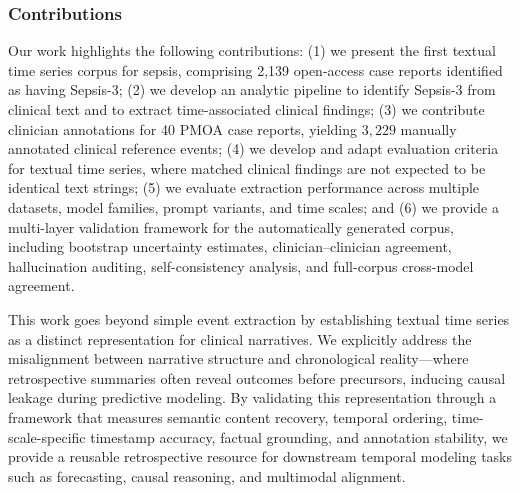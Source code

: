 \subsubsection{Contributions}
Our work highlights the following contributions:
(1) we present the first textual time series corpus for sepsis, comprising 2,139 open-access case reports identified as having Sepsis-3;
(2) we develop an analytic pipeline to identify Sepsis-3 from clinical text and to extract time-associated clinical findings;
(3) we contribute clinician annotations for 40 PMOA case reports, yielding $3,229$ manually annotated clinical reference events;
(4) we develop and adapt evaluation criteria for textual time series, where matched clinical findings are not expected to be identical text strings;
(5) we evaluate extraction performance across multiple datasets, model families, prompt variants, and time scales; and
(6) we provide a multi-layer validation framework for the automatically generated corpus, including bootstrap uncertainty estimates, clinician--clinician agreement, hallucination auditing, self-consistency analysis, and full-corpus cross-model agreement.

This work goes beyond simple event extraction by establishing textual time series as a distinct representation for clinical narratives.
We explicitly address the misalignment between narrative structure and chronological reality---where retrospective summaries often reveal outcomes before precursors, inducing causal leakage during predictive modeling.
By validating this representation through a framework that measures semantic content recovery, temporal ordering, time-scale-specific timestamp accuracy, factual grounding, and annotation stability, we provide a reusable retrospective resource for downstream temporal modeling tasks such as forecasting, causal reasoning, and multimodal alignment.

